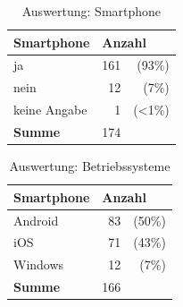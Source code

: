 \begin{table}[H]
\begin{center}
\begin{footnotesize}
\begin{tabular}{| l | r  r |}  \hline                       
  \textbf{Smartphone}              & \multicolumn{2}{|l|}{\textbf{Anzahl}}   \\ \hline 
  ja        &  161 &   (93\%)  \\  \hline  
  nein        &  12  &   (7\%)  \\  \hline  
  keine Angabe    &  1   &   (<1\%)  \\  \hline  
  \textbf{Summe}  & 174  &   \\  \hline  
\end{tabular}
\end{footnotesize}
\caption{Auswertung: Smartphone}
\label{tab:smartphone}
\end{center}
\end{table}

\begin{table}[H]
\begin{center}
\begin{footnotesize}
\begin{tabular}{| l | r  r |}  \hline                       
  \textbf{Smartphone}              & \multicolumn{2}{|l|}{\textbf{Anzahl}}   \\ \hline 
  Android    &  83 &   (50\%)  \\  \hline  
  iOS        &  71  &   (43\%)  \\  \hline  
  Windows    &  12   &   (7\%)  \\  \hline  
  \textbf{Summe}  & 166  &   \\  \hline  
\end{tabular}
\end{footnotesize}
\caption{Auswertung: Betriebssysteme}
\label{tab:os}
\end{center}
\end{table}

